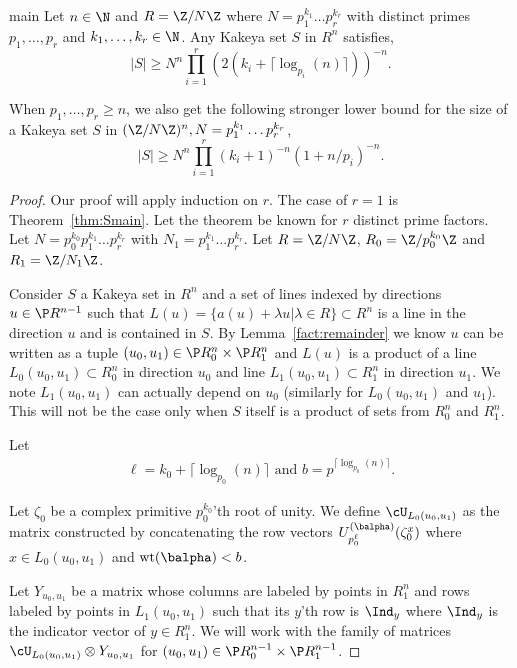 \begin{repthm}{main}
Let $n\in \N$ and $R=\Z/N\Z$  where $N=p_1^{k_1}\hdots p_r^{k_r}$ with distinct primes $p_1,\hdots,p_r$ and $k_1,\hdots,k_r\in \N$. Any Kakeya set $S$ in $R^n$ satisfies,
$$|S|\ge N^n\prod\limits_{i=1}^r (2(k_i+\lceil \log_{p_i}(n)\rceil))^{-n}.$$

When $p_1,\hdots,p_r\ge n$, we also get the following stronger lower bound for the size of a Kakeya set $S$ in $(\Z/N\Z)^n,N=p_1^{k_1}\hdots p_r^{k_r}$,
$$|S|\ge N^n\prod\limits_{i=1}^r(k_i+1)^{-n}(1+n/p_i)^{-n}.$$
\end{repthm}
\begin{proof}
Our proof will apply induction on $r$. The case of $r=1$ is Theorem~\ref{thm:Smain}. Let the theorem be known for $r$ distinct prime factors.
Let $N=p_0^{k_0}p_1^{k_1}\hdots p_r^{k_r}$ with $N_1=p_1^{k_1}\hdots p_r^{k_r}$. Let $R=\Z/N\Z$, $R_0=\Z/p_0^{k_0}\Z$ and $R_1=\Z/N_1\Z$. 

Consider $S$ a Kakeya set in $R^n$ and a set of lines indexed by directions $u\in \P R^{n-1}$ such that $L(u)=\{a(u)+\lambda u|\lambda \in R\}\subset R^n$ is a line in the direction $u$ and is contained in $S$. By Lemma~\ref{fact:remainder} we know $u$ can be written as a tuple $(u_0,u_1) \in \P R_0^{n} \times \P R_1^{n}$ and $L(u)$ is a product of a line $L_{0}(u_0,u_1)\subset R_0^n$ in direction $u_0$ and line $L_{1}(u_0,u_1)\subset R_1^n$ in direction $u_1$. We note $L_1(u_0,u_1)$ can actually depend on $u_0$ (similarly for $L_0(u_0,u_1)$ and $u_1$). This will not be the case only when $S$ itself is a product of sets from $R_0^n$ and $R_1^n$.

Let
\begin{align}\label{eq:b2}
\ell = k_0+\lceil \log_{p_0}(n)\rceil \text{ and } b =p^{\lceil \log_{p_0}(n)\rceil}.
\end{align} 

Let $\zeta_0$ be a complex primitive $p_0^{k_0}$'th root of unity. We define $\cU_{L_{0}(u_0,u_1)}$ as the matrix constructed by concatenating the row vectors $U_{p_0^\ell}^{(\balpha)}(\zeta_0^x)$ where $x\in L_{0}(u_0,u_1)$ and $\text{wt}(\balpha)<b$.

Let $Y_{u_0,u_1}$ be a matrix whose columns are labeled by points in $R_1^n$ and rows labeled by points in $L_1(u_0,u_1)$ such that its $y$'th row is $\Ind_y$ where $\Ind_y$ is the indicator vector of $y\in R_1^n$. We will work with the family of matrices $\cU_{L_{0}(u_0,u_1)}\otimes Y_{u_0,u_1}$ for $(u_0,u_1)\in \P R_0^{n-1}\times \P R_1^{n-1}$.


\end{proof}
